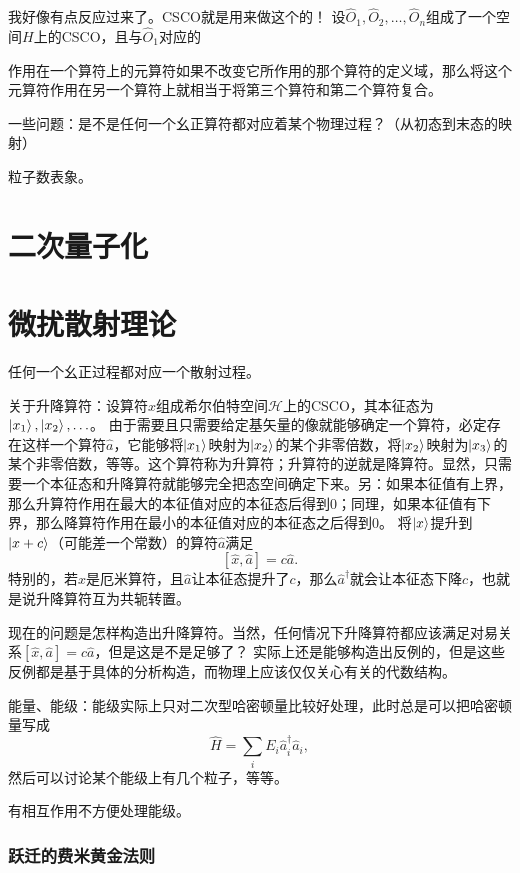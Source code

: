 \documentclass[UTF8, a4paper]{ctexart}
\begin{document}
我好像有点反应过来了。CSCO就是用来做这个的！
设$\hat{O}_1, \hat{O}_2, \ldots, \hat{O}_n$组成了一个空间$H$上的CSCO，且与$\hat{O}_1$对应的

作用在一个算符上的元算符如果不改变它所作用的那个算符的定义域，那么将这个元算符作用在另一个算符上就相当于将第三个算符和第二个算符复合。

一些问题：是不是任何一个幺正算符都对应着某个物理过程？（从初态到末态的映射）

粒子数表象。

\section{二次量子化}

\section{微扰散射理论}

任何一个幺正过程都对应一个散射过程。

关于升降算符：设算符$\hat{x}$组成希尔伯特空间$\mathcal{H}$上的CSCO，其本征态为$\ket{x_1}, \ket{x_2}, \ldots$。
由于需要且只需要给定基矢量的像就能够确定一个算符，必定存在这样一个算符$\hat{a}$，它能够将$\ket{x_1}$映射为$\ket{x_2}$的某个非零倍数，将$\ket{x_2}$映射为$\ket{x_3}$的某个非零倍数，等等。这个算符称为升算符；升算符的逆就是降算符。显然，只需要一个本征态和升降算符就能够完全把态空间确定下来。另：如果本征值有上界，那么升算符作用在最大的本征值对应的本征态后得到$0$；同理，如果本征值有下界，那么降算符作用在最小的本征值对应的本征态之后得到$0$。
将$\ket{x}$提升到$\ket{x+c}$（可能差一个常数）的算符$\hat{a}$满足
\[
    [\hat{x}, \hat{a}] = c \hat{a}.
\]
特别的，若$\hat{x}$是厄米算符，且$\hat{a}$让本征态提升了$c$，那么$\hat{a}^\dagger$就会让本征态下降$c$，也就是说升降算符互为共轭转置。

现在的问题是怎样构造出升降算符。当然，任何情况下升降算符都应该满足对易关系$[\hat{x}, \hat{a}] = c \hat{a}$，但是这是不是足够了？
实际上还是能够构造出反例的，但是这些反例都是基于具体的分析构造，而物理上应该仅仅关心有关的代数结构。

能量、能级：能级实际上只对二次型哈密顿量比较好处理，此时总是可以把哈密顿量写成
\[
    \hat{H} = \sum_i E_i \hat{a}^\dagger_i \hat{a}_i,
\]
然后可以讨论某个能级上有几个粒子，等等。

有相互作用不方便处理能级。



\subsubsection{跃迁的费米黄金法则}
\end{document}
